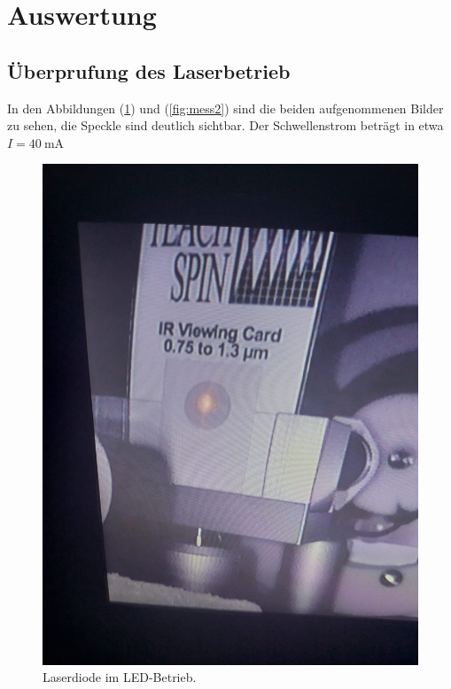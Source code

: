 
\section{Auswertung}
\label{sec:Auswertung}
\subsection{Überprufung des Laserbetrieb}
\label{sec:über1}
In den Abbildungen (\ref{fig:mess1}) und (\ref{fig:mess2}) sind die beiden aufgenommenen Bilder zu sehen, die Speckle sind deutlich sichtbar. Der Schwellenstrom beträgt in etwa $I=\SI{40}{\milli\ampere}$
\begin{figure}[h!]
  \centering
  \includegraphics[scale=0.1]{fig/led.jpeg}
  \caption{Laserdiode im LED-Betrieb.}
  \label{fig:mess1}
\end{figure}
\FloatBarrier
